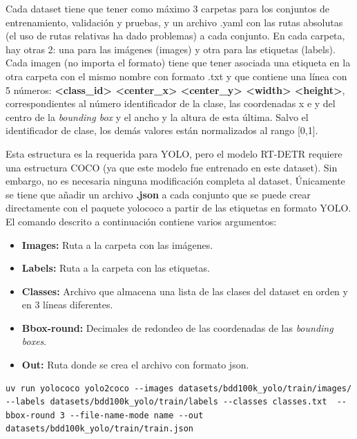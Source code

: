 \documentclass[12pt,a4paper,onecolumn,oneside]{report}
\begin{document}
Cada dataset tiene que tener como máximo 3 carpetas para los conjuntos de entrenamiento, validación y pruebas, y un archivo .yaml con las rutas absolutas (el uso de rutas relativas ha dado problemas) a cada conjunto. En cada carpeta, hay otras 2: una para las imágenes (images) y otra para las etiquetas (labels). Cada imagen (no importa el formato) tiene que tener asociada una etiqueta en la otra carpeta con el mismo nombre con formato .txt y que contiene una línea con 5 números: \textbf{<class\_id> <center\_x> <center\_y> <width> <height>}, correspondientes al número identificador de la clase, las coordenadas x e y del centro de la \textit{bounding box} y el ancho y la altura de esta última. Salvo el identificador de clase, los demás valores están normalizados al rango [0,1].

Esta estructura es la requerida para YOLO, pero el modelo RT-DETR requiere una estructura COCO (ya que este modelo fue entrenado en este dataset). Sin embargo, no es necesaria ninguna modificación completa al dataset. Únicamente se tiene que añadir un archivo \textbf{.json} a cada conjunto que se puede crear directamente con el paquete yolococo a partir de las etiquetas en formato YOLO. El comando descrito a continuación contiene varios argumentos:
\begin{itemize}
    \item \textbf{Images:} Ruta a la carpeta con las imágenes.
    
    \item \textbf{Labels:} Ruta a la carpeta con las etiquetas.
    
    \item \textbf{Classes:} Archivo que almacena una lista de las clases del dataset en orden y en 3 líneas diferentes.
    
    \item \textbf{Bbox-round:} Decimales de redondeo de las coordenadas de las \textit{bounding boxes}.
    
    \item \textbf{Out:} Ruta donde se crea el archivo con formato json.
\end{itemize}  

\begin{lstlisting}
uv run yolococo yolo2coco --images datasets/bdd100k_yolo/train/images/ --labels datasets/bdd100k_yolo/train/labels --classes classes.txt  --bbox-round 3 --file-name-mode name --out datasets/bdd100k_yolo/train/train.json
\end{lstlisting}
\end{document}
